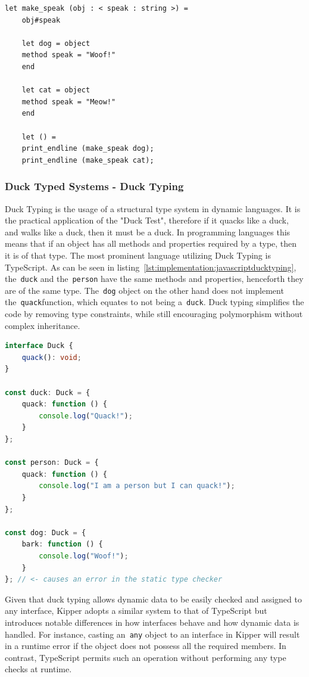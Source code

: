 \begin{lstlisting}[language=caml,caption=Example of structural typing in Ocaml,label=lst:implementation:ocamlstructuraltyping]
	let make_speak (obj : < speak : string >) =
	obj#speak

	let dog = object
	method speak = "Woof!"
	end

	let cat = object
	method speak = "Meow!"
	end

	let () =
	print_endline (make_speak dog);
	print_endline (make_speak cat);
\end{lstlisting}

\subsubsection{Duck Typed Systems - Duck Typing}

Duck Typing is the usage of a structural type system in dynamic languages. It is the practical application of the "Duck Test", therefore if it quacks like a duck, and walks like a duck, then it must be a duck. In programming languages this means that if an object has all methods and properties required by a type, then it is of that type. The most prominent language utilizing Duck Typing is TypeScript. As can be seen in listing~\ref{lst:implementation:javascriptducktyping}, the~\lstinline|duck| and the~\lstinline|person| have the same methods and properties, henceforth they are of the same type. The~\lstinline|dog| object on the other hand does not implement the~\lstinline|quack|function, which equates to not being a~\lstinline|duck|. Duck typing simplifies the code by removing type constraints, while still encouraging polymorphism without complex inheritance.

\begin{lstlisting}[language=Typescript,caption=Example of duck typing in TypeScript,label=lst:implementation:javascriptducktyping]
interface Duck {
	quack(): void;
}

const duck: Duck = {
	quack: function () {
		console.log("Quack!");
	}
};

const person: Duck = {
	quack: function () {
		console.log("I am a person but I can quack!");
	}
};

const dog: Duck = {
	bark: function () {
		console.log("Woof!");
	}
}; // <- causes an error in the static type checker
\end{lstlisting}

Given that duck typing allows dynamic data to be easily checked and assigned to any interface, Kipper adopts a similar system to that of TypeScript but introduces notable differences in how interfaces behave and how dynamic data is handled. For instance, casting an~\lstinline|any| object to an interface in Kipper will result in a runtime error if the object does not possess all the required members. In contrast, TypeScript permits such an operation without performing any type checks at runtime.

